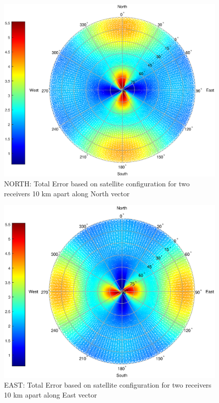 \begin{figure}
\centering
\caption{NORTH: Total Error based on satellite configuration for two receivers 10 km apart along North vector}
\label{fig:plane_total_north1_pow4}
\includegraphics[width=0.7\linewidth]{ChapterExperiments/Figures/plane_total_north1_pow4}
\end{figure}

\begin{figure}
\centering
\caption{EAST: Total Error based on satellite configuration for two receivers 10 km apart along East vector}
\label{fig:plane_total_east_pow4}
\includegraphics[width=0.7\linewidth]{ChapterExperiments/Figures/plane_total_east_pow4}
\end{figure}

